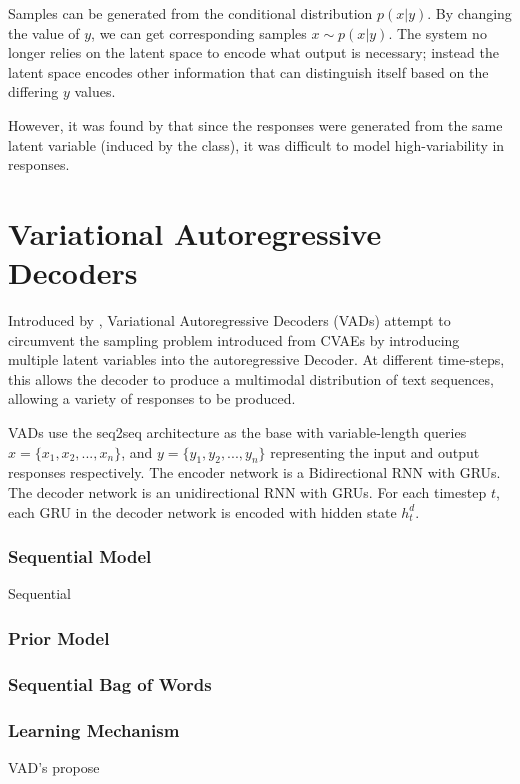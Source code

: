 \documentclass[12pt,twoside]{report}
\begin{document}
Samples can be generated from the conditional distribution $p(x|y)$. By changing the value of $y$, we can get corresponding samples $x \sim p(x|y)$. The system no longer relies on the latent space to encode what output is necessary; instead the latent space encodes other information that can distinguish itself based on the differing $y$ values.

However, it was found by \cite{du_variational_2018} that since the responses were generated from the same latent variable (induced by the class), it was difficult to model high-variability in responses.

\section{Variational Autoregressive Decoders}

Introduced by \cite{du_variational_2018}, Variational Autoregressive Decoders (VADs) attempt to circumvent the sampling problem introduced from CVAEs by introducing multiple latent variables into the autoregressive Decoder. At different time-steps, this allows the decoder to produce a multimodal distribution of text sequences, allowing a variety of responses to be produced. 

VADs use the seq2seq architecture as the base with variable-length queries $x = \{x_1, x_2, ..., x_n\}$, and $y = \{y_1, y_2, ..., y_n\}$ representing the input and output responses respectively. The encoder network is a Bidirectional RNN with GRUs. The decoder network is an unidirectional RNN with GRUs. For each timestep $t$, each GRU in the decoder network is encoded with hidden state $h^d_t$.

\subsubsection{Sequential Model}

Sequential

\subsubsection{Prior Model}

\subsubsection{Sequential Bag of Words}

\subsubsection{Learning Mechanism}


VAD's propose 








 
\end{document}

